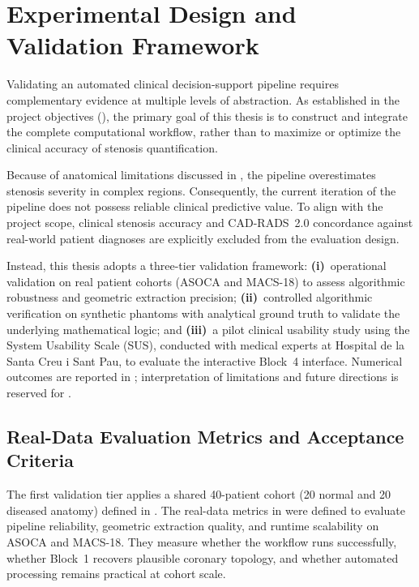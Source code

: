 \section{Experimental Design and Validation Framework}
\label{sec:methodology-validation}

Validating an automated clinical decision-support pipeline requires complementary evidence at multiple levels of abstraction. As established in the project objectives (), the primary goal of this thesis is to construct and integrate the complete computational workflow, rather than to maximize or optimize the clinical accuracy of stenosis quantification.

Because of anatomical limitations discussed in , the pipeline overestimates stenosis severity in complex regions. Consequently, the current iteration of the pipeline does not possess reliable clinical predictive value. To align with the project scope, clinical stenosis accuracy and CAD-RADS~2.0 concordance against real-world patient diagnoses are explicitly excluded from the evaluation design.

Instead, this thesis adopts a three-tier validation framework: \textbf{(i)}~operational validation on real patient cohorts (ASOCA and MACS-18) to assess algorithmic robustness and geometric extraction precision; \textbf{(ii)}~controlled algorithmic verification on synthetic phantoms with analytical ground truth to validate the underlying mathematical logic; and \textbf{(iii)}~a pilot clinical usability study using the System Usability Scale (SUS), conducted with medical experts at Hospital de la Santa Creu i Sant Pau, to evaluate the interactive Block~4 interface. Numerical outcomes are reported in ; interpretation of limitations and future directions is reserved for .

\subsection{Real-Data Evaluation Metrics and Acceptance Criteria}
\label{subsec:validation-real-metrics}

The first validation tier applies a shared 40-patient cohort (20 normal and 20 diseased anatomy) defined in . The real-data metrics in  were defined to evaluate pipeline reliability, geometric extraction quality, and runtime scalability on ASOCA and MACS-18. They measure whether the workflow runs successfully, whether Block~1 recovers plausible coronary topology, and whether automated processing remains practical at cohort scale.

